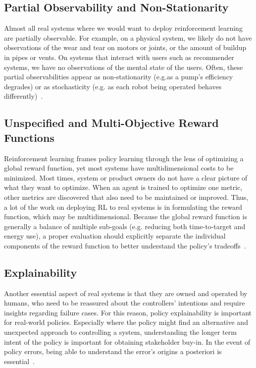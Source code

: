 \documentclass[letterpaper, 10 pt]{IEEEconf}
\begin{document}
\subsection{Partial Observability and Non-Stationarity}

Almost all real systems where we would want to deploy reinforcement
learning are partially observable. For example, on a physical system,
we likely do not have observations of the wear and tear on motors or
joints, or the amount of buildup in pipes or vents. On systems that
interact with users such as recommender systems, we have no
observations of the mental state of the users. Often, these partial
observabilities appear as non-stationarity (e.g.as a pump’s efficiency
degrades) or as stochasticity (e.g. as each robot being operated
behaves differently)~\cite{deepmind2019}.

\subsection{Unspecified and Multi-Objective Reward Functions}

Reinforcement learning frames policy learning through the lens of
optimizing a global reward function, yet most systems have
multidimensional costs to be minimized. Most times, system or product
owners do not have a clear picture of what they want to optimize. When
an agent is trained to optimize one metric, other metrics are
discovered that also need to be maintained or improved. Thus, a lot of
the work on deploying RL to real systems is in formulating the reward
function, which may be multidimensional. Because the global reward
function is generally a balance of multiple sub-goals (e.g. reducing
both time-to-target and energy use), a proper evaluation should
explicitly separate the individual components of the reward function
to better understand the policy’s tradeoffs~\cite{deepmind2019}.

\subsection{Explainability}

Another essential aspect of real systems is that they are owned and
operated by humans, who need to be reassured about the controllers’
intentions and require insights regarding failure cases. For this
reason, policy explainability is important for real-world
policies. Especially where the policy might find an alternative and
unexpected approach to controlling a system, understanding the longer
term intent of the policy is important for obtaining stakeholder
buy-in. In the event of policy errors, being able to understand the
error’s origins a posteriori is essential~\cite{deepmind2019}.
\end{document}
